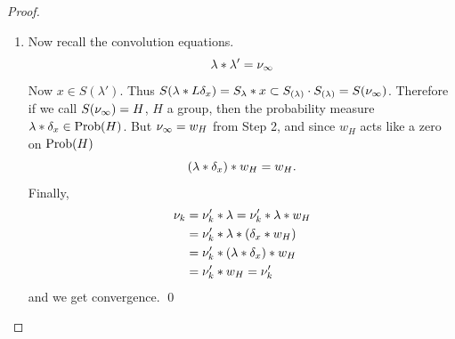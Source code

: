 \begin{proof}
\begin{enumerate}
\begin{enumerate}
\item[Step 3]  Now recall the convolution equations.
\[
     \lambda * \lambda' = \nu_\infty
\]
Now $x \in S(\lambda')$.  
Thus $S(\lambda *L \delta_x) = S_\lambda * x \subset S_{(\lambda)} \cdot S_{(\lambda)} = S(\nu_\infty)$.  
Therefore if we call $S(\nu_\infty) = H$, $H$ a group, then the probability measure $\lambda * \delta_x \in \hbox{Prob}(H)$.
But $\nu_\infty = w_H$ from Step 2, and since $w_H$ acts like a zero on
$\hbox{Prob}(H)$
\[
     (\lambda * \delta_x) * w_H = w_H.
\]
Finally,
\[
\begin{aligned}
       \nu_k &= \nu'_k * \lambda = \nu'_k * \lambda * w_H  \\
       &= \nu_k' * \lambda * (\delta_x * w_H)             \\
       &= \nu'_k * (\lambda * \delta_x) * w_H             \\
       &= \nu'_k * w_H = \nu'_k
\end{aligned}
\]
and we get convergence.
\qed
\end{enumerate}
\end{enumerate}
%
\end{proof}
